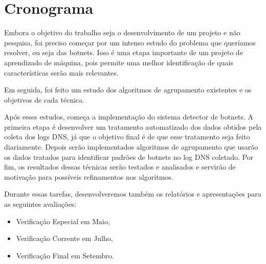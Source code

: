 \chapter{Cronograma}
Embora o objetivo do trabalho seja o desenvolvimento de um projeto e não pesquisa, foi preciso começar por um intenso estudo do problema que queríamos resolver, ou seja das botnets. Isso é uma etapa importante de um projeto de aprendizado de máquina, pois permite uma melhor identificação de quais características serão mais relevantes.

Em seguida, foi feito um estudo dos algoritmos de agrupamento existentes e os objetivos de cada técnica.

Após esses estudos, começa a implementação do sistema detector de botnets. A primeira etapa é desenvolver um tratamento automatizado dos dados obtidos pela coleta dos logs DNS, já que o objetivo final é de que esse tratamento seja feito diariamente. Depois serão implementados algoritmos de agrupamento que usarão os dados tratados para identificar padrões de botnets no log DNS coletado. Por fim, os resultados dessas técnicas serão testados e analisados e servirão de motivação para possíveis refinamentos nos algoritmos.

Durante essas tarefas, desenvolveremos também os relatórios e apresentações para as seguintes avaliações:

\begin{itemize}  
\item Verificação Especial em Maio,
\item Verificação Corrente em Julho,
\item Verificação Final em Setembro.
\end{itemize}

